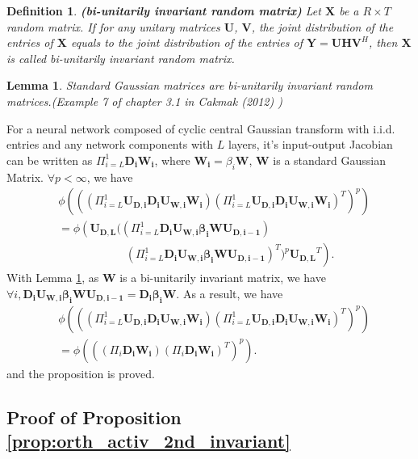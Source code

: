 \documentclass[10pt,journal,compsoc]{IEEEtran}
\newtheorem{lemma}[theorem]{Lemma}
\newtheorem{definition}{Definition}[section]
\begin{document}
\begin{definition}
\textbf{(bi-unitarily invariant random matrix)}\cite{cakmak2012non}
Let $\mathbf{X}$ be a $R\times T$ random matrix. If for any unitary matrices $\mathbf{U}$, $\mathbf{V}$, the joint distribution of the entries of $\mathbf{X}$ equals to the joint distribution of the entries of $\mathbf{Y}=\mathbf{UHV}^{H}$, then $\mathbf{X}$ is called bi-unitarily invariant random matrix.
\end{definition}

\begin{lemma}
Standard Gaussian matrices are bi-unitarily invariant random matrices.(Example 7 of chapter 3.1 in Cakmak (2012) \cite{cakmak2012non})
\label{lemma:bi_unitary_gaussain}
\end{lemma}

For a neural network composed of cyclic central Gaussian transform with i.i.d. entries and any network components with $L$ layers, it's input-output Jacobian can be written as $\Pi_{i=L}^1\mathbf{D_i}\mathbf{W_i}$, where $\mathbf{W_i}=\beta_i \mathbf{W}$, $\mathbf{W}$ is a standard Gaussian Matrix. $\forall p < \infty$, we have
\begin{equation}
\begin{split}
    & \phi\left(\left((\Pi_{i=L}^1 \mathbf{U_{D,i}D_iU_{W,i}W_i})(\Pi_{i=L}^1 \mathbf{U_{D,i}D_iU_{W,i}W_i})^T\right)^p\right)\\
    &=\phi\left(\mathbf{U_{D, L}}((\Pi_{i=L}^1 \mathbf{D_iU_{W,i}\beta_iWU_{D,i-1}})\right.\\
    &~~~~~~~~~~~~~~~~~~~~~~~~~~~\left.(\Pi_{i=L}^1 \mathbf{D_iU_{W,i}\beta_iWU_{D,i-1}})^T)^p\mathbf{U_{D, L}}^T\right).
\end{split}
\end{equation}
With Lemma \ref{lemma:bi_unitary_gaussain}, as $\mathbf{W}$ is a bi-unitarily invariant matrix, we have $\forall i, \mathbf{D_iU_{W,i}\beta_iWU_{D,i-1}} = \mathbf{D_i\beta_iW}$. As a result, we have
\begin{equation}
\begin{split}
    & \phi\left(\left((\Pi_{i=L}^1 \mathbf{U_{D,i}D_iU_{W,i}W_i})(\Pi_{i=L}^1 \mathbf{U_{D,i}D_iU_{W,i}W_i})^T\right)^p\right)\\
    &  =\phi\left(\left((\Pi_{i} \mathbf{D_iW_i})(\Pi_{i} \mathbf{D_iW_i})^T\right)^p\right).
\end{split}
\end{equation}
and the proposition is proved.
 
\subsection{Proof of Proposition \ref{prop:orth_activ_2nd_invariant}}\label{proof:orth_activ_2nd_invariant}
\end{document}
